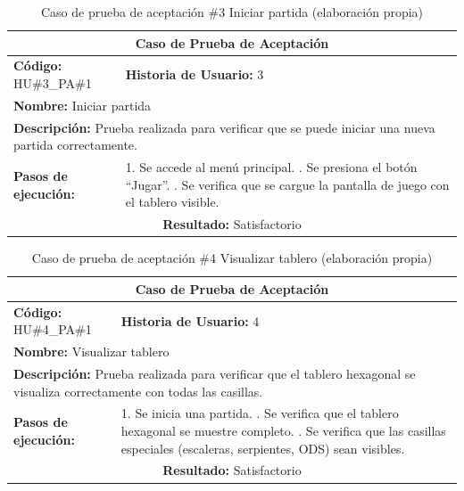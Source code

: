 \begin{table}[H]
\centering
\caption{Caso de prueba de aceptación \#3 Iniciar partida (elaboración propia)\label{tab:cpa3}}
\renewcommand{\arraystretch}{1.3}
\begin{tabular}{|p{}|p{}|}
\hline
\multicolumn{2}{|c|}{\textbf{Caso de Prueba de Aceptación}} \\
\hline
\textbf{Código:} HU\#3\_PA\#1 & \textbf{Historia de Usuario:} 3 \\
\hline
\multicolumn{2}{|l|}{\textbf{Nombre:} Iniciar partida} \\
\hline
\multicolumn{2}{|p{0.9\textwidth}|}{\textbf{Descripción:} Prueba realizada para verificar que se puede iniciar una nueva partida correctamente.} \\
\hline
\textbf{Pasos de ejecución:} & 1. Se accede al menú principal. \newline 2. Se presiona el botón ``Jugar''. \newline 3. Se verifica que se cargue la pantalla de juego con el tablero visible. \\
\hline
\multicolumn{2}{|c|}{\textbf{Resultado:} Satisfactorio} \\
\hline
\end{tabular}
\end{table}

\begin{table}[H]
\centering
\caption{Caso de prueba de aceptación \#4 Visualizar tablero (elaboración propia)\label{tab:cpa4}}
\renewcommand{\arraystretch}{1.3}
\begin{tabular}{|p{}|p{}|}
\hline
\multicolumn{2}{|c|}{\textbf{Caso de Prueba de Aceptación}} \\
\hline
\textbf{Código:} HU\#4\_PA\#1 & \textbf{Historia de Usuario:} 4 \\
\hline
\multicolumn{2}{|l|}{\textbf{Nombre:} Visualizar tablero} \\
\hline
\multicolumn{2}{|p{0.9\textwidth}|}{\textbf{Descripción:} Prueba realizada para verificar que el tablero hexagonal se visualiza correctamente con todas las casillas.} \\
\hline
\textbf{Pasos de ejecución:} & 1. Se inicia una partida. \newline 2. Se verifica que el tablero hexagonal se muestre completo. \newline 3. Se verifica que las casillas especiales (escaleras, serpientes, ODS) sean visibles. \\
\hline
\multicolumn{2}{|c|}{\textbf{Resultado:} Satisfactorio} \\
\hline
\end{tabular}
\end{table}

